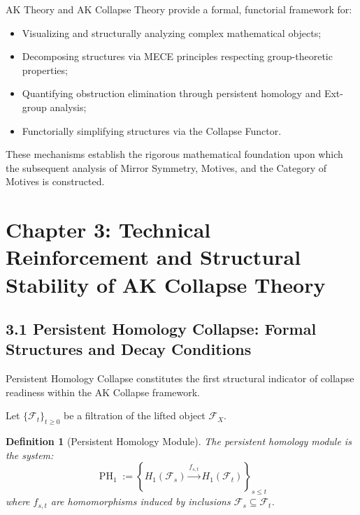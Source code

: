 \documentclass[11pt]{article}
\newtheorem{definition}[theorem]{Definition}
\DeclareMathOperator{\PH}{PH}
\begin{document}
AK Theory and AK Collapse Theory provide a formal, functorial framework for:

\begin{itemize}
    \item Visualizing and structurally analyzing complex mathematical objects;
    \item Decomposing structures via MECE principles respecting group-theoretic properties;
    \item Quantifying obstruction elimination through persistent homology and Ext-group analysis;
    \item Functorially simplifying structures via the Collapse Functor.
\end{itemize}

These mechanisms establish the rigorous mathematical foundation upon which the subsequent analysis of Mirror Symmetry, Motives, and the Category of Motives is constructed.

\FloatBarrier




\section{Chapter 3: Technical Reinforcement and Structural Stability of AK Collapse Theory}

\subsection{3.1 Persistent Homology Collapse: Formal Structures and Decay Conditions}

Persistent Homology Collapse constitutes the first structural indicator of collapse readiness within the AK Collapse framework.

Let $\{\mathcal{F}_t\}_{t \geq 0}$ be a filtration of the lifted object $\mathcal{F}_X$.

\begin{definition}[Persistent Homology Module]
The persistent homology module is the system:
\begin{equation}
\PH_1 := \left\{ H_1(\mathcal{F}_s) \xrightarrow{f_{s,t}} H_1(\mathcal{F}_t) \right\}_{s \leq t}
\end{equation}
where $f_{s,t}$ are homomorphisms induced by inclusions $\mathcal{F}_s \subseteq \mathcal{F}_t$.
\end{definition}
\end{document}
